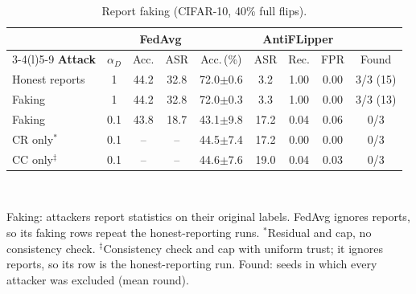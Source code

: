 \begin{table}[t]
\centering
\caption{Report faking (CIFAR-10, 40\% full flips).}
\label{tab:adaptive}
\footnotesize
\setlength{\tabcolsep}{2.4pt}
\begin{tabular}{@{}l c cc ccccc@{}}
\toprule
& & \multicolumn{2}{c}{\textbf{FedAvg}} & \multicolumn{5}{c}{\textbf{AntiFLipper}} \\
\cmidrule(lr){3-4}\cmidrule(l){5-9}
\textbf{Attack} & $\alpha_D$ & Acc. & ASR & Acc.\,(\%) & ASR & Rec. & FPR & Found \\
\midrule
Honest reports & 1 & 44.2 & 32.8 & 72.0{\scriptsize$\pm$0.6} & 3.2 & 1.00 & 0.00 & 3/3 (15) \\
\midrule
Faking & 1 & 44.2 & 32.8 & 72.0{\scriptsize$\pm$0.3} & 3.3 & 1.00 & 0.00 & 3/3 (13) \\
Faking & 0.1 & 43.8 & 18.7 & 43.1{\scriptsize$\pm$9.8} & 17.2 & 0.04 & 0.06 & 0/3 \\
\quad CR only$^{*}$ & 0.1 & -- & -- & 44.5{\scriptsize$\pm$7.4} & 17.2 & 0.00 & 0.00 & 0/3 \\
\quad CC only$^{\ddagger}$ & 0.1 & -- & -- & 44.6{\scriptsize$\pm$7.6} & 19.0 & 0.04 & 0.03 & 0/3 \\
\bottomrule
\end{tabular}
\\[2pt]\parbox{\linewidth}{\scriptsize Faking: attackers report statistics on their original labels. FedAvg ignores reports, so its faking rows repeat the honest-reporting runs. $^{*}$Residual and cap, no consistency check. $^{\ddagger}$Consistency check and cap with uniform trust; it ignores reports, so its row is the honest-reporting run. Found: seeds in which every attacker was excluded (mean round).}
\end{table}
